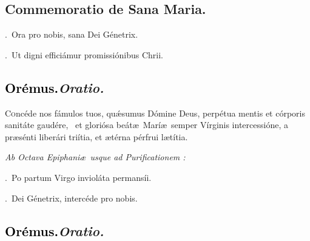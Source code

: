 \documentclass[12pt]{article} %
\newenvironment{rubric}{\vspace{2 mm}\color{benred8} \itshape \leftskip 0in \setlength{\parindent}{0.25in}}{\vspace{2 mm}}
\newenvironment{response}{\leftskip 0in \setlength{\parindent}{0in}}{\vspace{2 mm}}
\let\oldgresixstar\gresixstar
\renewcommand{\gresixstar}{\textcolor{benred8}{\oldgresixstar}}
\let\oldVbar\Vbar
\renewcommand{\Vbar}{\textcolor{benred8}{\oldVbar .}}
\let\oldRbar\Rbar
\renewcommand{\Rbar}{\textcolor{benred8}{\oldRbar .}}
\def\capitulumSpace{\hspace{20 mm}}
\begin{document}

\subsection*{Commemoratio de Sana Maria.}


\gresetfirstlineaboveinitial{\small \textsc{ \textbf{\textcolor{benred8}{I}}}}{\small \textsc{ \textbf{\textcolor{benred8}{I}}}}

\begin{response}
\Vbar\ Ora pro nobis, sana Dei G\'{e}netrix.

\Rbar\ Ut digni effici\'{a}mur promissi\'{o}nibus Chrii.

\end{response}

\subsection*{\textcolor{black}{Or\'{e}mus.}\capitulumSpace \emph{Oratio.}}

\begin{response}\lettrine{C}{o}nc\'{e}de nos f\'{a}mulos tuos, qu\'{\ae}sumus D\'{o}mine Deus, perp\'{e}tua mentis et c\'{o}rporis sanit\'{a}te gaud\'{e}re, \gresixstar\ et glori\'{o}sa be\'{a}t\ae\ Mar\'{i}\ae\ semper V\'{i}rginis intercessi\'{o}ne, a pr\ae s\'{e}nti liber\'{a}ri tri\'{i}tia, et \ae t\'{e}rna p\'{e}rfrui l\ae t\'{i}tia.

\end{response}

\begin{rubric}
Ab Octava Epiphani\ae\ usque ad Purificationem :

\end{rubric}

\begin{response}
\Vbar\ Po partum Virgo inviol\'{a}ta permans\'{i}i.

\Rbar\ Dei G\'{e}netrix, interc\'{e}de pro nobis.

\end{response}

\subsection*{\textcolor{black}{Or\'{e}mus.}\capitulumSpace \emph{Oratio.}}
\end{document}
